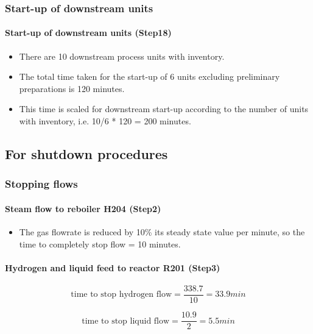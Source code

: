 \subsubsection{Start-up of downstream units }
\paragraph{Start-up of downstream units (Step18)}
    \begin{itemize}
        \item There are 10 downstream process units with inventory.
        \item The total time taken for the start-up of 6 units excluding preliminary preparations is 120 minutes.
        \item This time is scaled for downstream start-up according to the number of units with inventory, i.e. 10/6 * 120 = 200 minutes.
    \end{itemize}

\subsection{For shutdown procedures}

\subsubsection{Stopping flows}
\paragraph{Steam flow to reboiler H204 (Step2)}   
    \begin{itemize}
        \item The gas flowrate is reduced by 10\% its steady state value per minute, so the time to completely stop flow = 10 minutes.
    \end{itemize}
    
\paragraph{Hydrogen and liquid feed to reactor R201 (Step3)}
    \begin{equation}
        \text{time to stop hydrogen flow} = \frac{338.7}{10}=33.9 min
    \end{equation}
    
    \begin{equation}
        \text{time to stop liquid flow} = \frac{10.9}{2}=5.5 min
    \end{equation}
    
